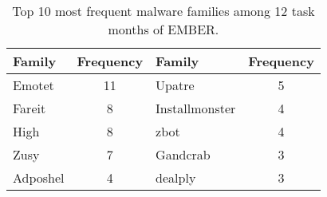 \begin{table}[!t]
\small
\centering
\caption{Top 10 most frequent malware families among 12 task months of EMBER.}
\vspace{-0.25cm}
\begin{tabular}{l|c||l|c}
\textbf{Family} & \textbf{Frequency} & \textbf{Family} & \textbf{Frequency} \\ \hline
Emotet & 11 & Upatre & 5 \\ 
Fareit & 8 & Installmonster & 4 \\
High & 8 &  zbot & 4\\ 
Zusy & 7 & Gandcrab & 3 \\ 
Adposhel & 4 & dealply & 3\\ 
\bottomrule
\end{tabular}
\label{tab:top10_families}
\vspace{-0.3cm}
\end{table}

